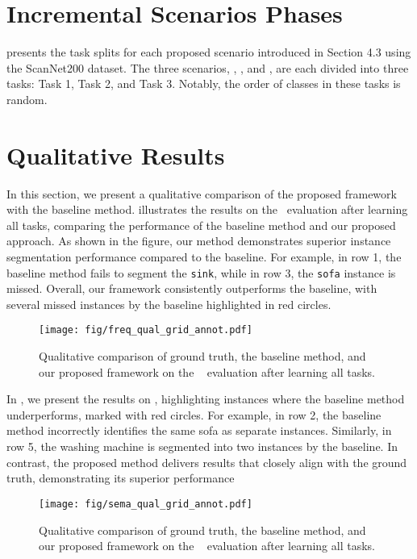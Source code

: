 
\section{Incremental Scenarios Phases}
\label{app:split_fullview}
 presents the task splits for each proposed scenario introduced in Section 4.3 using the ScanNet200 dataset. The three scenarios, \fsplit, \ssplit, and \rsplit, are each divided into three tasks: Task 1, Task 2, and Task 3. Notably, the order of classes in these tasks is random. 


\section{Qualitative Results}
\label{app:qual_results}
In this section, we present a qualitative comparison of the proposed framework with the baseline method.  illustrates the results on the \fsplit~evaluation after learning all tasks, comparing the performance of the baseline method and our proposed approach. As shown in the figure, our method demonstrates superior instance segmentation performance compared to the baseline. For example, in row 1, the baseline method fails to segment the \texttt{sink}, while in row 3, the \texttt{sofa} instance is missed. Overall, our framework consistently outperforms the baseline, with several missed instances by the baseline highlighted in red circles.

\begin{figure*}[!htb]
  \centering
  \texttt{[image: fig/freq\_qual\_grid\_annot.pdf]}
  \caption{Qualitative comparison of ground truth, the baseline method, and our proposed framework on the \fsplit~ evaluation after learning all tasks.}
  \label{fig:fsplit_qual}
\end{figure*}

In , we present the results on \ssplit, highlighting instances where the baseline method underperforms, marked with red circles. For example, in row 2, the baseline method incorrectly identifies the same sofa as separate instances. Similarly, in row 5, the washing machine is segmented into two instances by the baseline. In contrast, the proposed method delivers results that closely align with the ground truth, demonstrating its superior performance

\begin{figure*}[!htb]
  \centering
  \texttt{[image: fig/sema\_qual\_grid\_annot.pdf]}
  \caption{Qualitative comparison of ground truth, the baseline method, and our proposed framework on the \ssplit~ evaluation after learning all tasks.}
  \label{fig:ssplit_qual}
\end{figure*}

